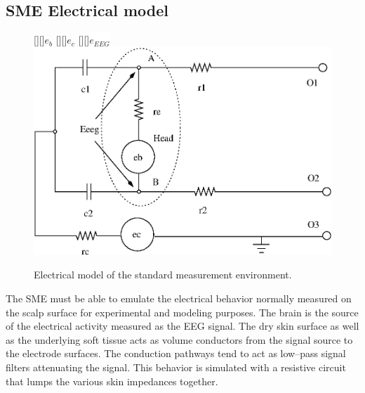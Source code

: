 \subsection{SME Electrical model}
\begin{figure}[ht]
\begin{center}
	[][]{$e_b$}		
	[][]{$e_c$} %
	[][]{\colorbox{white}{$e_{EEG}$}}			
	\includegraphics[width=\textwidth]{sme-eq.eps}
	\caption{Electrical model of the standard measurement environment.}
	\label{fig:sme-eq}
	\end{center}
\end{figure}

The SME must be able to emulate the electrical behavior normally
measured on the scalp surface for experimental and modeling
purposes. The brain is the source of the electrical activity measured
as the EEG signal. The dry skin surface as well as the underlying soft
tissue acts as volume conductors from the signal source to the
electrode surfaces. The conduction pathways tend to act as low--pass
signal filters attenuating the signal. This behavior is simulated with
a resistive circuit that lumps the various skin impedances together.

